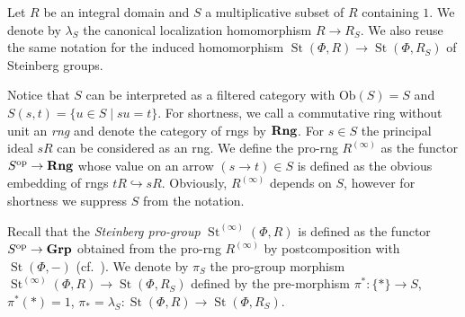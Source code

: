 \documentclass[oneside, 11pt]{amsart} \pdfoutput=1
\newcommand{\St}{\mathop{\mathrm{St}}\nolimits}
\numberwithin{equation}{section}
\theoremstyle{definition}
\newcommand{\catname}[1]{{\normalfont\textbf{#1}}} %
\begin{document}
Let $R$ be an integral domain and $S$ a multiplicative subset of $R$ containing $1$. 
We denote by $\lambda_S$ the canonical localization homomorphism $R \to R_S$.
We also reuse the same notation for the induced homomorphism $\St(\Phi, R) \to \St(\Phi, R_S)$ of Steinberg groups.

Notice that $S$ can be interpreted as a filtered category with $\mathrm{Ob}(S) = S$ and $S(s, t) = \{ u \in S \mid su = t \}$.
For shortness, we call a commutative ring without unit an {\it rng} and denote the category of rngs by $\catname{Rng}$.
For $s\in S$ the principal ideal $sR$ can be considered as an rng. We define the pro-rng $R^{(\infty)}$ as the functor $S^\mathrm{op} \to \catname{Rng}$ whose value on an arrow $(s \to t)\in S$ is defined as the obvious embedding of rngs $tR \hookrightarrow sR$. Obviously, $R^{(\infty)}$ depends on $S$, however for shortness we suppress $S$ from the notation.

Recall that the {\it Steinberg pro-group} $\St^{(\infty)}(\Phi, R)$ is defined as the functor $S^\mathrm{op} \to \catname{Grp}$ obtained from the pro-rng $R^{(\infty)}$ by postcomposition with $\St(\Phi, -)$ (cf.~\cite[\S~2.4]{LSV20}). We denote by $\pi_S$ the pro-group morphism $\St^{(\infty)}(\Phi, R) \to \St(\Phi, R_S)$ defined by the pre-morphism $\pi^* \colon \{* \} \to S$, $\pi^*(*) = 1$, $\pi_{*} = \lambda_S \colon \St(\Phi, R) \to \St(\Phi, R_S)$. 
\end{document}
